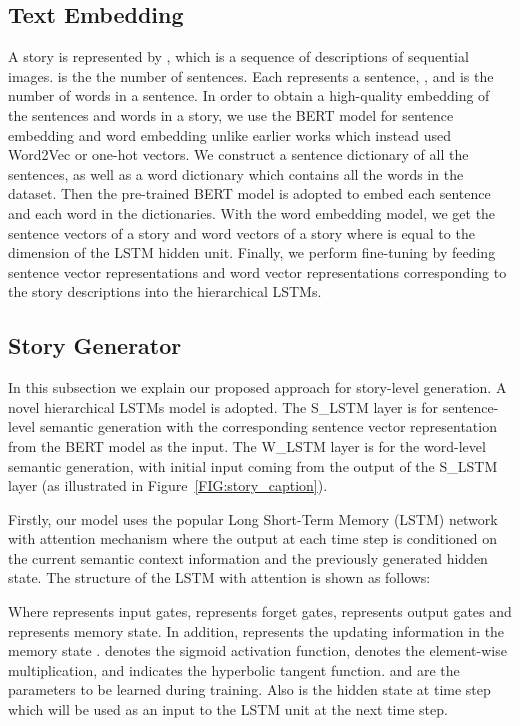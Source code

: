 \documentclass[a4paper,fleqn]{cas-sc}
\begin{document}
\subsection{Text Embedding}
A story is represented by , which is a sequence of   descriptions of sequential images.  is the the number of sentences. Each  represents a sentence,  ,  and  is the number of words in a sentence. In order to obtain a high-quality embedding of the sentences and words in a story, we use the BERT model for sentence embedding and word embedding unlike earlier works which instead used Word2Vec or one-hot vectors. We  construct a sentence dictionary of all the sentences, as well as a word dictionary which contains all the words in the dataset. Then the pre-trained BERT model is adopted to embed each sentence and each word in the dictionaries. With the word embedding model, we get the sentence vectors of a story  and word vectors of a story  where  is equal to the dimension of the LSTM hidden unit. Finally, we perform fine-tuning by feeding sentence vector representations and word vector representations corresponding to the story descriptions into the hierarchical LSTMs.

\subsection{Story Generator}
In this subsection we explain our proposed approach for story-level generation. A novel hierarchical LSTMs model is adopted. The S\_LSTM layer is for sentence-level semantic generation with the corresponding sentence vector representation from the BERT model as the input. The W\_LSTM layer is for the word-level semantic generation, with initial input coming from the output of the S\_LSTM layer (as illustrated in Figure~\ref{FIG:story_caption}).

Firstly, our model uses the popular Long Short-Term Memory (LSTM) network with attention mechanism \citep{Xu2015Show} where the  output at each time step is conditioned on the current semantic context information and the previously generated hidden state. The structure of the LSTM with attention is shown as follows:



Where  represents input gates,  represents forget gates,  represents output gates and  represents memory state. In addition,  represents the updating information in the memory state .  denotes the sigmoid activation function,  denotes the element-wise multiplication, and  indicates the hyperbolic tangent function.  and  are the parameters to be learned during training. Also  is the hidden state at time step  which will be used as an input to the LSTM unit at the next time step.
\end{document}
